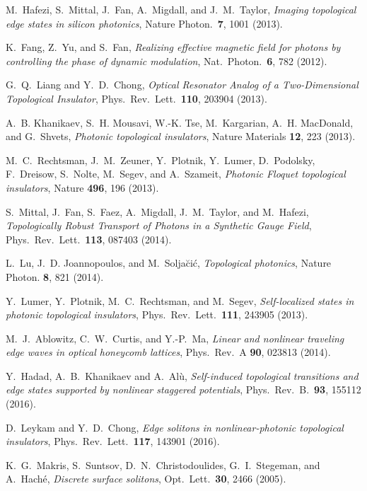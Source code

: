 \documentclass[aps,prx,twocolumn,superscriptaddress]{revtex4-1}
\begin{document}
\begin{thebibliography}{99}
  M.~Hafezi, S.~Mittal, J.~Fan, A.~Migdall, and J.~M.~Taylor, {\it Imaging topological edge states in silicon photonics}, Nature Photon.~{\bf 7}, 1001 (2013).

  K.~Fang, Z.~Yu, and S.~Fan, \textit{Realizing effective magnetic field for photons by controlling the phase of dynamic modulation}, Nat.~Photon.~\textbf{6}, 782 (2012).

 G.~Q.~Liang and Y.~D.~Chong, \textit{Optical Resonator Analog of a Two-Dimensional Topological Insulator}, Phys.~Rev.~Lett.~\textbf{110}, 203904 (2013).

  A.~B. Khanikaev, S.~H. Mousavi, W.-K. Tse, M.~Kargarian, A.~H. MacDonald, and G.~Shvets, {\it Photonic topological insulators}, Nature Materials {\bf 12}, 223 (2013).

  M.~C.~Rechtsman, J.~M.~Zeuner, Y.~Plotnik, Y.~Lumer, D.~Podolsky, F.~Dreisow, S.~Nolte, M.~Segev, and A.~Szameit, {\it Photonic Floquet topological insulators}, Nature {\bf 496}, 196 (2013).


 S.~Mittal, J.~Fan, S.~Faez, A.~Migdall, J.~M.~Taylor, and M.~Hafezi, \textit{Topologically Robust Transport of Photons in a Synthetic Gauge Field}, Phys.~Rev.~Lett.~\textbf{113}, 087403 (2014).

  L.~Lu, J.~D. Joannopoulos, and M.~Solja\u{c}i\'{c}, {\it Topological photonics}, Nature Photon. {\bf 8}, 821 (2014).

  Y.~Lumer, Y.~Plotnik, M.~C.~Rechtsman, and M.~Segev, {\it Self-localized states in photonic topological insulators}, Phys.~Rev.~Lett.~{\bf 111}, 243905 (2013).

M.~J.~Ablowitz, C.~W.~Curtis, and Y.-P.~Ma, {\it Linear and nonlinear traveling edge waves in optical honeycomb lattices}, Phys.~Rev.~A {\bf 90}, 023813 (2014).

 Y.~Hadad, A.~B.~Khanikaev and A.~Al\`u, \textit{Self-induced topological transitions and edge states supported by nonlinear staggered potentials}, Phys.~Rev.~B.~\textbf{93}, 155112 (2016).

  D.~Leykam and Y.~D.~Chong, \textit{Edge solitons in nonlinear-photonic topological insulators}, Phys.~Rev.~Lett.~\textbf{117}, 143901 (2016).

 K.~G.~Makris, S.~Suntsov, D.~N.~Christodoulides, G.~I.~Stegeman, and A.~Hach\'e, \textit{Discrete surface solitons}, Opt.~Lett.~\textbf{30}, 2466 (2005).


\end{thebibliography}
\end{document}
